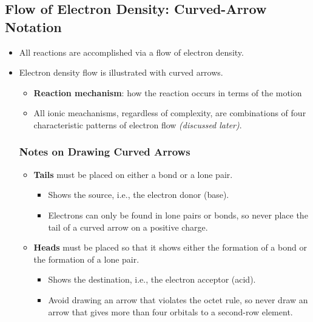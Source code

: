 \documentclass[12pt,a4paper]{article}
\begin{document}
\subsection{Flow of Electron Density: Curved-Arrow Notation}
\begin{itemize}
    \item All reactions are accomplished via a flow of electron density.
    \item Electron density flow is illustrated with curved arrows.
        \begin{itemize}
            \item \textbf{Reaction mechanism}: how the reaction occurs in terms of the motion 
            \item All ionic meachanisms, regardless of complexity, are combinations of four characteristic patterns of electron flow \textit{(discussed later)}.
        \end{itemize}
    \subsubsection{Notes on Drawing Curved Arrows}
    \begin{itemize}
        \item \textbf{Tails} must be placed on either a bond or a lone pair.
            \begin{itemize}
                \item Shows the {\color{o-Sun}source}, i.e., the electron donor (base).
                \item Electrons can only be found in lone pairs or bonds, so {\color{o-Sun}never place the tail} of a curved arrow on a {\color{pos}positive charge}.
            \end{itemize}
        \item \textbf{Heads} must be placed so that it shows either the formation of a bond or the formation of a lone pair.
            \begin{itemize}
                \item Shows the {\color{o-Sun}destination}, i.e., the electron acceptor (acid).
                \item Avoid drawing an arrow that violates the octet rule, so never draw an arrow that gives more than four orbitals to a second-row element.
            \end{itemize}
    \end{itemize}
\end{itemize}
\end{document}
